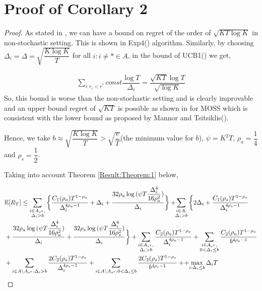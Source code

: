 \section{Proof of Corollary 2}
\label{App:Proof:Corollary:2}
\begin{proof}
As stated in \cite{auer2010ucb}, we can have a bound on regret of the order of $\sqrt{KT\log K}$ in non-stochastic setting. This is shown in Exp4(\cite{auer2002nonstochastic}) algorithm. Similarly, by choosing  $\Delta_{i}=\Delta=\sqrt{\dfrac{K\log K}{T}}$ for all ${i:i\neq *}\in A$, in the bound of UCB1(\cite{auer2002finite}) we get,

\begin{align*}
\sum_{i:r_{i}<r^{*}}const \dfrac{\log T}{\Delta_{i}}=\dfrac{\sqrt{KT}\log T}{\sqrt{\log K}}
\end{align*}
So, this bound is worse than the non-stochastic setting and is clearly improvable and an upper bound regret of $\sqrt{KT}$ is possible as shown in \cite{audibert2009minimax} for MOSS which is consistent with the lower bound as proposed by Mannor and Tsitsiklis(\cite{mannor2004sample}).

	Hence, we take $b\approx\sqrt{\dfrac{K\log K}{T}} > \sqrt{\dfrac{e}{T}}$(the minimum value for $b$), $\psi=K^{2}T$, $\rho_{a}=\dfrac{1}{4}$ and $\rho_{s}=\dfrac{1}{2}$.
	
	Taking into account Theorem \ref{Result:Theorem:1} below, 
	
\begin{align*}
&\mathbb{E} [R_{T}]\leq 
\sum\limits_{\substack{i\in A_{s^{*}},\\\Delta_{i} > b}}\bigg\lbrace \dfrac{C_1(\rho_{a})T^{1-\rho_{a}}}{\Delta_{i}^{4\rho_{a}-1}} + \Delta_{i}
 + \frac{32\rho_{a}\log{(\psi T\dfrac{\Delta_{i}^{4}}{16\rho_{a}^{2}})}}{\Delta_{i}} \bigg\rbrace
 + \! \! \sum\limits_{\substack{i\in A,\\\Delta_{i} > b}} \bigg\lbrace 2\Delta_{i}+
\dfrac{C_1(\rho_{s})T^{1-\rho_{s}}}{\Delta_{i}^{4\rho_{s}-1}} \\
&+ \frac{32\rho_{a}\log{(\psi T\dfrac{\Delta_{i}^{4}}{16\rho_{a}^{2}})}}{\Delta_{i}} 
+ \dfrac{32\rho_{s}\log{(\psi T\dfrac{\Delta_{i}^{4}}{16\rho_{s}^{2}})}}{\Delta_{i}}\bigg\rbrace 
+ \sum\limits_{\substack{i\in A_{s^{*}},\\ \Delta_{i} > b}} 
\frac{C_2(\rho_{a})T^{1-\rho_{a}}}{\Delta_{i}^{4\rho_{a}-1}}
+\sum\limits_{\substack{i\in A_{s^{*}},\\0 < \Delta_{i}\leq b}}\frac{C_2(\rho_a)T^{1-\rho_{a}}}{b^{4\rho_{a} -1}}\\ 
 & + \sum_{i\in A\setminus A_{s^*}: \Delta_{i} > b}\dfrac{2C_{2}(\rho_{s})T^{1-\rho_{s}}}{\Delta_{i}^{4\rho_{s}-1}} +\sum_{i\in A\setminus A_{s^*}: 0 < \Delta_{i} \leq b}\dfrac{2C_{2}(\rho_{s})T^{1-\rho_{s}}}{b^{4\rho_{s}-1}} +
 \!+\! \max\limits_{i:\Delta_{i}\leq b}\Delta_{i}T
\end{align*}


\end{proof}
